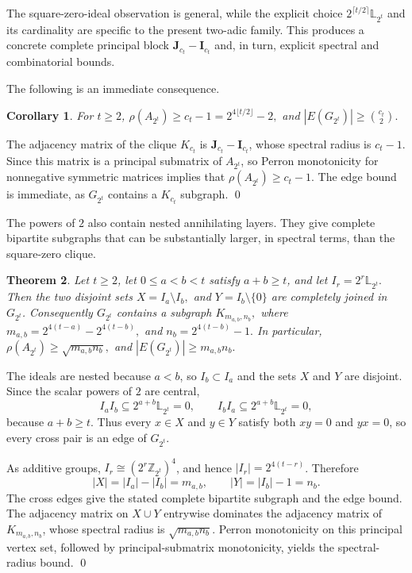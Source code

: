 \documentclass[12pt]{article}
\renewenvironment{proof}{{\bf \noindent Proof.}}{\qed}
\newtheorem{theorem}{Theorem}[section]
\newtheorem{corollary}[theorem]{Corollary}
\theoremstyle{definition}
\newcommand{\LL}{\mathbb{L}}
\newcommand{\I}{\mathbf{I}}
\newcommand{\J}{\mathbf{J}}
\begin{document}
	\medskip
	The square-zero-ideal observation is general, while the explicit choice $2^{\lceil t/2\rceil}\LL_{2^t}$ and its cardinality are specific to the present two-adic family. This produces a concrete complete principal block $\J_{c_t}-\I_{c_t}$ and, in turn, explicit spectral and combinatorial bounds. 
	
	\medskip
	The following is an immediate consequence.
	\begin{corollary}\label{cor:2powerbounds}
		For $t\ge 2$, $\rho(A_{2^t})\ge c_t-1=2^{4\lfloor t/2\rfloor}-2,$ 	and $	|E(G_{2^t})|\ge \binom{c_t}{2}.$ 
	\end{corollary}
	
	\begin{proof}
		The adjacency matrix of the clique $K_{c_t}$ is $\J_{c_t}-\I_{c_t}$, whose spectral radius is $c_t-1$. Since this matrix is a principal submatrix of $A_{2^t}$, so Perron monotonicity for nonnegative symmetric matrices implies that  $\rho(A_{2^t})\ge c_t-1.$ The edge bound is immediate,  as $G_{2^t}$ contains a $K_{c_t}$ subgraph.
	\end{proof}
	
	\medskip
	The powers of $2$ also contain nested annihilating layers. They give complete bipartite subgraphs that can be substantially larger, in spectral terms, than the square-zero clique.
	
	\begin{theorem}\label{thm:annihilatorlayers}
		Let $t\ge2$, let $0\le a<b<t$ satisfy $a+b\ge t$, and let
		$
		I_r=2^r\LL_{2^t}.
		$
		Then the two disjoint sets
		$
		X=I_a\setminus I_b,
		$ and $
		Y=I_b\setminus\{0\}
		$
		are completely joined in $G_{2^t}$. Consequently $G_{2^t}$ contains a subgraph
		$
		K_{m_{a,b},n_b},
		$
		where
		$
		m_{a,b}=2^{4(t-a)}-2^{4(t-b)},
		$ and $
		n_b=2^{4(t-b)}-1.
		$
		In particular,
		$
		\rho(A_{2^t})\ge\sqrt{m_{a,b}n_b},
		$ and $
		|E(G_{2^t})|\ge m_{a,b}n_b.
		$
	\end{theorem}
	
	\begin{proof}
		The ideals are nested because $a<b$, so $I_b\subset I_a$ and the sets $X$ and $Y$ are disjoint. Since the scalar powers of $2$ are central,
		$$
		I_aI_b\subseteq2^{a+b}\LL_{2^t}=0,
		\qquad
		I_bI_a\subseteq2^{a+b}\LL_{2^t}=0,
		$$
		because $a+b\ge t$. Thus every $x\in X$ and $y\in Y$ satisfy both $xy=0$ and $yx=0$, so every cross pair is an edge of $G_{2^t}$.
		
		As additive groups, $I_r\cong(2^r\mathbb Z_{2^t})^4$, and hence $|I_r|=2^{4(t-r)}$. Therefore
		$$
		|X|=|I_a|-|I_b|=m_{a,b},
		\qquad
		|Y|=|I_b|-1=n_b.
		$$
		The cross edges give the stated complete bipartite subgraph and the edge bound. The adjacency matrix on $X\cup Y$ entrywise dominates the adjacency matrix of $K_{m_{a,b},n_b}$, whose spectral radius is $\sqrt{m_{a,b}n_b}$. Perron monotonicity on this principal vertex set, followed by principal-submatrix monotonicity, yields the spectral-radius bound.
	\end{proof}
	\medskip
	
\end{document}

